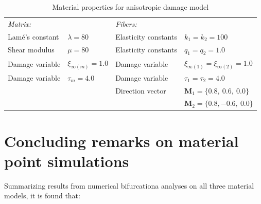 \documentclass[12pt]{article}
\newcommand{\tensor}[1]{\ensuremath{\boldsymbol{#1}}}
\numberwithin{equation}{section}
\begin{document}
\begin{table}[H]
  \begin{center}
    \begin{tabular}{ l l l l }
      \toprule
      \it{Matrix}:
      &
      
      &
     
      \it{Fibers}:
      
      &
      \\
      Lam\'{e}'s constant
      &
      $\lambda=80$
      &
      Elasticity constants
      &
      $k_1 = k_2 = 100$
      \\
      Shear modulus
      &
      $\mu = 80$
      &
      Elasticity constants
      &
      $q_1 = q_2 = 1.0$      
      \\
      Damage variable  
      &
      $\xi_{\infty(m)} = 1.0$
      &
      Damage variable
      &
      $\xi_{\infty(1)} = \xi_{\infty(2)} = 1.0$      
      \\
      Damage variable   
      &
      $\tau_m = 4.0$
      &
      Damage variable
      &
      $\tau_1 = \tau_2 = 4.0$
      \\
      &
      
      &
      Direction vector
      &
      $\tensor M_1 = \{ 0.8,~0.6,~0.0\}$
      \\
      &

      &
	       
      &
      $\tensor M_2 = \{ 0.8,-0.6,~0.0\}$
      \\
      \bottomrule
    \end{tabular}
    \caption{Material properties for anisotropic damage model}
    \label{tab:mat_aniso}
  \end{center}
\end{table}



\section{Concluding remarks on material point simulations}
Summarizing results from numerical bifurcationa analyses on all three
material models, it is found that:
\end{document}
